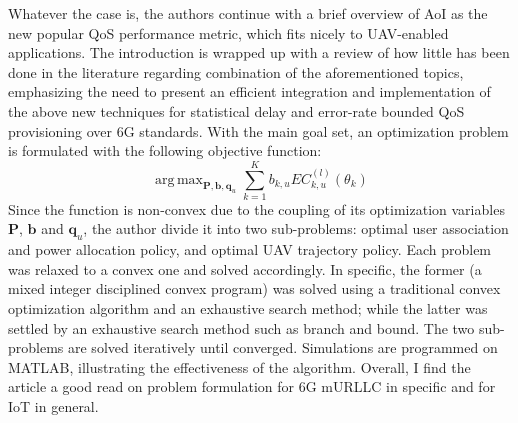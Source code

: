 \documentclass[12pt, a4paper, onside]{article}
\DeclareMathOperator*{\argmax}{arg\,max}
\renewcommand{\vec}{\mathbf}
\begin{document}
Whatever the case is, the authors continue with a brief overview of AoI as the new popular QoS performance metric, which fits nicely to UAV-enabled applications. The introduction is wrapped up with a review of how little has been done in the literature regarding combination of the aforementioned topics, emphasizing the need to present an efficient integration and implementation of the above new techniques for statistical delay and error-rate bounded QoS provisioning over 6G standards. With the main goal set, an optimization problem is formulated with the following objective function:
\begin{equation}
\argmax_{\vec{P}, \vec{b}, \vec{q}_{u}}{\sum_{k=1}^{K}{b_{k, u}EC_{k, u}^{\left(l\right)}\left(\theta_{k}\right)}}
\end{equation}
Since the function is non-convex due to the coupling of its optimization variables $\vec{P}$, $\vec{b}$ and $\vec{q}_{u}$, the author divide it into two sub-problems: optimal user association and power allocation policy, and optimal UAV trajectory policy. Each problem was relaxed to a convex one and solved accordingly. In specific, the former (a mixed integer disciplined convex program) was solved using a traditional convex optimization algorithm and an exhaustive search method; while the latter was settled by an exhaustive search method such as branch and bound. The two sub-problems are solved iteratively until converged. Simulations are programmed on MATLAB, illustrating the effectiveness of the algorithm. Overall, I find the article a good read on problem formulation for 6G mURLLC in specific and for IoT in general.

\printbibliography
\end{document}
